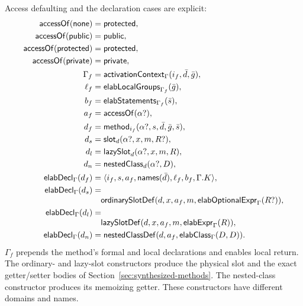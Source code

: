 Access defaulting and the declaration cases are explicit:
\begin{equation}\label{eq:declaration-elaboration}
\begin{aligned}
 \mathsf{accessOf}(\mathsf{none})&=\mathsf{protected},\\
 \mathsf{accessOf}(\mathsf{public})&=\mathsf{public},\\
 \mathsf{accessOf}(\mathsf{protected})&=\mathsf{protected},\\
 \mathsf{accessOf}(\mathsf{private})&=\mathsf{private},\\
 \Gamma_f&=\mathsf{activationContext}_{\Gamma}(i_f,\bar d,\bar g),\\
 \ell_f&=\mathsf{elabLocalGroups}_{\Gamma_f}(\bar g),\\
 b_f&=\mathsf{elabStatements}_{\Gamma_f}(\bar s),\\
 a_f&=\mathsf{accessOf}(\alpha?),\\
 d_f&=\mathsf{method}_{i_f}(\alpha?,s,\bar d,\bar g,\bar s),\\
 d_s&=\mathsf{slot}_{d}(\alpha?,x,m,R?),\\
 d_l&=\mathsf{lazySlot}_{d}(\alpha?,x,m,R),\\
 d_n&=\mathsf{nestedClass}_{d}(\alpha?,D),\\
 \mathsf{elabDecl}_{\Gamma}(d_f)
   &=\langle i_f,s,a_f,\mathsf{names}(\bar d),
       \ell_f,b_f,\Gamma.K\rangle,\\
 \mathsf{elabDecl}_{\Gamma}(d_s)&=\\[-1mm]
 &\quad\mathsf{ordinarySlotDef}(d,x,a_f,m,
       \mathsf{elabOptionalExpr}_{\Gamma}(R?)),\\
 \mathsf{elabDecl}_{\Gamma}(d_l)&=\\[-1mm]
 &\quad\mathsf{lazySlotDef}(d,x,a_f,m,
       \mathsf{elabExpr}_{\Gamma}(R)),\\
 \mathsf{elabDecl}_{\Gamma}(d_n)&=\mathsf{nestedClassDef}(d,a_f,
       \mathsf{elabClass}_{\Gamma}(D,D)).
\end{aligned}
\end{equation}
$\Gamma_f$ prepends the method's formal and local declarations and enables
local return.  The ordinary- and lazy-slot constructors produce the physical
slot and the exact getter/setter bodies of
Section~\ref{sec:synthesized-methods}.  The nested-class constructor produces
its memoizing getter.  These constructors have different domains and names.

